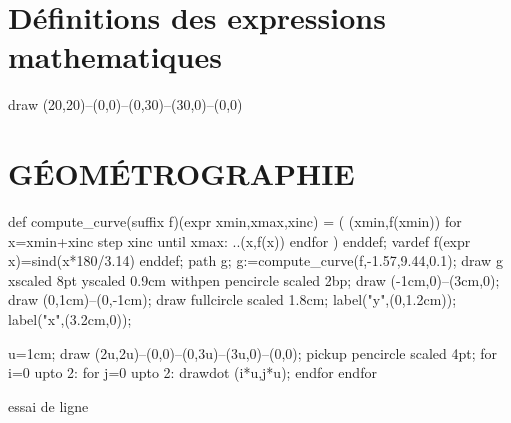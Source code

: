 \documentclass[12pt,a4paper,twocolumn]{book} %
\begin{document}
\section{Définitions des expressions mathematiques}


\begin{mpinline}
draw (20,20)--(0,0)--(0,30)--(30,0)--(0,0)
\end{mpinline}

\section{GÉOMÉTROGRAPHIE}
\begin{mpdisplay}
def compute_curve(suffix f)(expr xmin,xmax,xinc) = ( (xmin,f(xmin))
    for x=xmin+xinc step xinc until xmax: ..(x,f(x)) endfor )
enddef;
vardef f(expr x)=sind(x*180/3.14) enddef;
path g;
g:=compute_curve(f,-1.57,9.44,0.1);
draw g xscaled 8pt yscaled 0.9cm withpen pencircle scaled 2bp;
draw (-1cm,0)--(3cm,0);
draw (0,1cm)--(0,-1cm);
draw fullcircle scaled 1.8cm;
label("y",(0,1.2cm));
label("x",(3.2cm,0));
\end{mpdisplay}
\begin{mpdisplay}
u=1cm;
draw (2u,2u)--(0,0)--(0,3u)--(3u,0)--(0,0);
pickup pencircle scaled 4pt;
for i=0 upto 2:
for j=0 upto 2: drawdot (i*u,j*u); endfor
endfor
\end{mpdisplay}

essai de ligne
\end{document}
